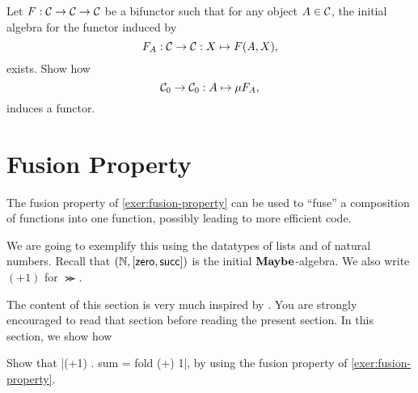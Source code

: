 \begin{exer} Let $F:\mathcal{C}\to\mathcal{C}\to\mathcal{C}$ be a bifunctor such that for any object $A\in\mathcal{C}$, the initial algebra for the functor induced by 
\[
F_A : \mathcal{C}\to\mathcal{C} : X\mapsto F(A,X),
\]
exists. Show how
\[
{\mathcal{C}}_0 \to {\mathcal{C}}_0 : A\mapsto \mu F_A ,
\]
induces a functor.
\end{exer}



\section{Fusion Property}\label{sec:fusion}

The fusion property of \cref{exer:fusion-property} can be used to ``fuse'' a composition of functions into one function, possibly leading to more efficient code.

We are going to exemplify this using the datatypes of lists and of natural numbers.
Recall that $(\mathbb{N}, [\mathsf{zero},\mathsf{succ}])$ is the initial $\mathbf{Maybe}$-algebra.
We also write $(+1)$ for $\Succ$.

\begin{reading*}
  The content of this section is very much inspired by \cite[\S3.2]{DBLP:journals/jfp/Hutton99}.
  You are strongly encouraged to read that section before reading the present section.
  In this section, we show how 
\end{reading*}

\begin{exer}
  Show that |(+1) . sum = fold (+) 1|, by using the fusion property of \cref{exer:fusion-property}.
\end{exer}

